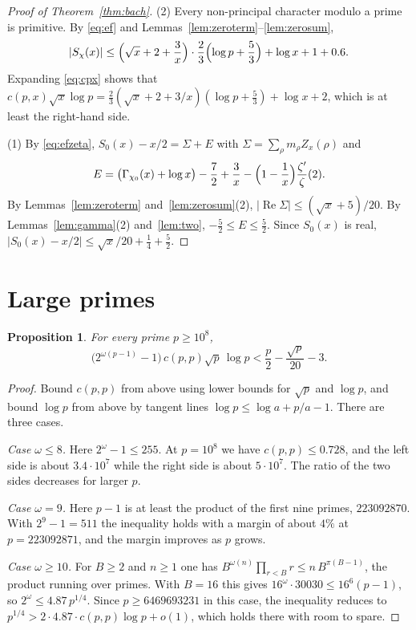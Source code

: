 \documentclass[11pt]{amsart}
\newtheorem{proposition}[theorem]{Proposition}
\theoremstyle{definition}
\theoremstyle{remark}
\renewcommand{\Re}{\operatorname{Re}}
\begin{document}
\begin{proof}[Proof of Theorem~\ref{thm:bach}]
(2) Every non-principal character modulo a prime is primitive. By \eqref{eq:ef} and Lemmas~\ref{lem:zeroterm}--\ref{lem:zerosum},
\[
|S_\chi(x)|\le\Bigl(\sqrt x+2+\frac3x\Bigr)\cdot\frac23\Bigl(\log p+\frac53\Bigr)+\log x+1+0.6 .
\]
Expanding \eqref{eq:cpx} shows that $c(p,x)\sqrt x\log p=\tfrac23(\sqrt x+2+3/x)(\log p+\tfrac53)+\log x+2$, which is at least the right-hand side.

(1) By \eqref{eq:efzeta}, $S_0(x)-x/2=\Sigma+E$ with $\Sigma=\sum_\rho m_\rho Z_x(\rho)$ and
\[
E=\bigl(\Gamma_{\chi_0}(x)+\log x\bigr)-\frac72+\frac3x-\Bigl(1-\frac1x\Bigr)\frac{\zeta'}{\zeta}(2).
\]
By Lemmas~\ref{lem:zeroterm} and~\ref{lem:zerosum}(2), $|\Re\Sigma|\le(\sqrt x+5)/20$. By Lemmas~\ref{lem:gamma}(2) and~\ref{lem:two}, $-\tfrac52\le E\le\tfrac52$. Since $S_0(x)$ is real, $|S_0(x)-x/2|\le\sqrt x/20+\tfrac14+\tfrac52$.
\end{proof}

\section{Large primes}\label{sec:large}

\begin{proposition}\label{prop:large}
For every prime $p\ge10^8$,
\[
\bigl(2^{\omega(p-1)}-1\bigr)\,c(p,p)\sqrt p\,\log p<\frac p2-\frac{\sqrt p}{20}-3 .
\]
\end{proposition}
\begin{proof}
Bound $c(p,p)$ from above using lower bounds for $\sqrt p$ and $\log p$, and bound $\log p$ from above by tangent lines $\log p\le\log a+p/a-1$. There are three cases.

\emph{Case $\omega\le8$.} Here $2^\omega-1\le255$. At $p=10^8$ we have $c(p,p)\le0.728$, and the left side is about $3.4\cdot10^7$ while the right side is about $5\cdot10^7$. The ratio of the two sides decreases for larger $p$.

\emph{Case $\omega=9$.} Here $p-1$ is at least the product of the first nine primes, $223092870$. With $2^9-1=511$ the inequality holds with a margin of about $4\%$ at $p=223092871$, and the margin improves as $p$ grows.

\emph{Case $\omega\ge10$.} For $B\ge2$ and $n\ge1$ one has $B^{\omega(n)}\prod_{r<B}r\le n\,B^{\pi(B-1)}$, the product running over primes. With $B=16$ this gives $16^{\omega}\cdot30030\le16^6(p-1)$, so $2^\omega\le4.87\,p^{1/4}$. Since $p\ge 6469693231$ in this case, the inequality reduces to $p^{1/4}>2\cdot4.87\cdot c(p,p)\log p+o(1)$, which holds there with room to spare.
\end{proof}
\end{document}
